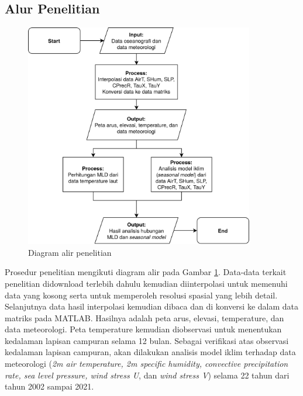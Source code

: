 \begin{spacing}{1.5}
\subsection[Alur Penelitian]{Alur Penelitian}
	\begin{figure}[H]
		\centering
		\includegraphics[width=10cm]{contents/Flowchart_Diagram.png}
		\caption{Diagram alir penelitian}
		\label{fig:flowchart}
	\end{figure}
	Prosedur penelitian mengikuti diagram alir pada Gambar \ref{fig:flowchart}. Data-data terkait penelitian didownload terlebih dahulu kemudian diinterpolasi untuk memenuhi data yang kosong serta untuk memperoleh resolusi spasial yang lebih detail. Selanjutnya data hasil interpolasi kemudian dibaca dan di konversi ke dalam data matriks pada MATLAB. Hasilnya adalah peta arus, elevasi, temperature, dan data meteorologi. Peta temperature kemudian diobservasi untuk menentukan kedalaman lapisan campuran selama 12 bulan. Sebagai verifikasi atas observasi kedalaman lapisan campuran, akan dilakukan analisis model iklim terhadap data meteorologi (\textit{2m air temperature, 2m specific humidity, convective precipitation rate, sea level pressure, wind stress U}, dan \textit{wind stress V}) selama 22 tahun dari tahun 2002 sampai 2021.
\end{spacing}
\vspace{-0.5pc}

